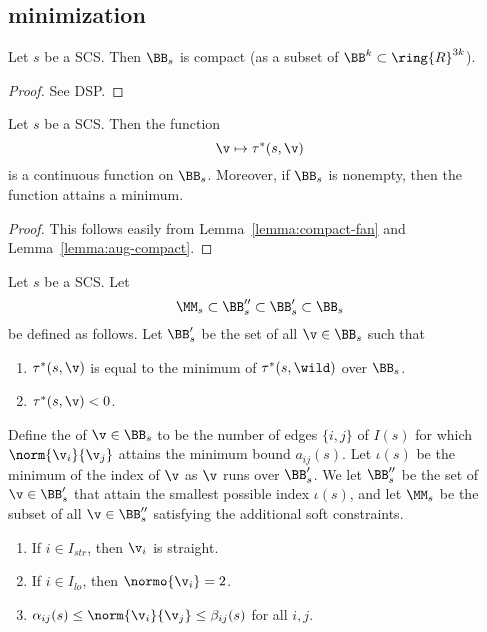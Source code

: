 



\subsection{minimization}


\begin{lemma} \label{lemma:aug-compact}
Let $s$ be a SCS. Then
$\BB_s$ is compact (as a subset of
$\BB^k \subset \ring{R}^{3k}$).
\end{lemma}

\begin{proof}  See DSP.
\end{proof}

\begin{lemma}[continuity]\label{lemma:hdpv2}
Let $s$ be a SCS.  Then the function 
\[
\v\mapsto \tau^*(s,\v)
\]
is a continuous function on $\BB_s$.  Moreover, if $\BB_s$ is
nonempty, then the function attains a minimum.
\end{lemma}

\begin{proof} This follows easily from Lemma~\ref{lemma:compact-fan} and
Lemma~\ref{lemma:aug-compact}.
\end{proof}



\begin{definition}
Let $s$ be a SCS.
Let 
\[
\MM_{s}\subset \BB''_{s}\subset \BB'_s\subset \BB_{s}
\]
be defined as follows.
Let $\BB'_{s}$ be the set of all $\v\in \BB_{s}$ such that
\begin{enumerate}
\item $\tau^*(s,\v)$ is equal to the minimum of $\tau^*(s,\wild)$ over $\BB_{s}$.
\item $\tau^*(s,\v)< 0$.
\end{enumerate}
Define the  of $\v\in \BB_s$ to be the number of edges $\{i,j\}$ of $I(s)$
for which $\norm{\v_i}{\v_j}$ attains the minimum bound $a_{i j}(s)$.  Let $\iota(s)$ be the minimum
of the index of $\v$ as $\v$ runs over $\BB'_s$.  
We let $\BB''_{s}$  be the set of $\v\in \BB'_{s}$ that attain
the smallest possible index $\iota(s)$,
and let $\MM_s$ be the subset of all $\v\in\BB''_s$ satisfying the additional soft
constraints.
\begin{enumerate}
\item If $i\in I_{str}$,  then $\v_i$ is straight.
\item If $i\in I_{lo}$,  then $\normo{\v_i}=2$.
\item $\alpha_{ij}(s)\le \norm{\v_i}{\v_j}\le \beta_{ij}(s)$ for all $i,j$.
\end{enumerate}
\end{definition}



